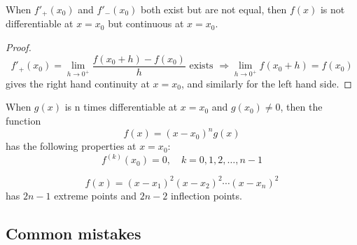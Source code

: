 \documentclass{overview}
\begin{document}
\begin{theorem}
	When $f'_+(x_0)$ and $f'_-(x_0)$ both exist but are not equal, then
	$f(x)$ is not differentiable at $x = x_0$ but continuous at $x = x_0$.
	\begin{proof}
		\[
			f'_+(x_0) = \lim_{h \to 0^{+}} \frac{f(x_0 + h) - f(x_0)}{h} \text{ exists }
			\Rightarrow \lim_{h \to 0^{+}} f(x_0 + h) = f(x_0)
		\] 
		gives the right hand continuity at $x = x_0$, and similarly for the left hand side.
	\end{proof}
\end{theorem}

\begin{theorem}
	When $g(x)$ is n times differentiable at $x = x_0$ and $g(x_0) \neq 0$,
	then the function
	\[
		f(x) = (x-x_0)^{n}g(x)
	\] 
	has the following properties at $x = x_0$:
	\[
		f^{(k)}(x_0) = 0, \quad k = 0,1,2,\ldots,n-1
	\] 
\end{theorem}
\begin{theorem}
	\[
	f(x) = (x-x_1)^2 (x-x_2)^2 \cdots (x-x_n)^2
	\] 
	has $2n-1$ extreme points and  $2n-2$ inflection points.
\end{theorem}

\subsection{Common mistakes}
\end{document}
